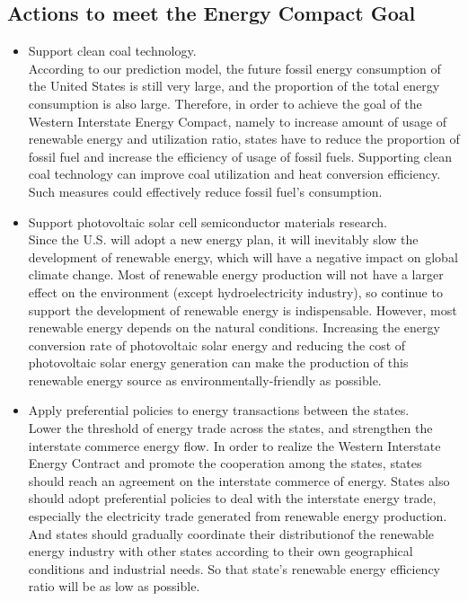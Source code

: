 \subsection{Actions to meet the Energy Compact Goal}
\begin{itemize}
	\item Support clean coal technology.\\ According to our prediction model, the future fossil energy consumption of the United States is still very large, and the proportion of the total energy consumption is also large.  Therefore, in order to achieve the goal of the Western Interstate Energy Compact, namely to increase amount of usage of renewable energy and utilization ratio, states have to reduce the proportion of fossil fuel and increase the efficiency of usage of fossil fuels. Supporting clean coal technology can improve coal utilization and heat conversion efficiency. Such measures could effectively reduce fossil fuel's consumption.
	\item Support photovoltaic solar cell semiconductor materials research.\\ Since the U.S. will adopt a new energy plan, it will inevitably slow the development of renewable energy, which will have a negative impact on global climate change. Most of renewable energy production will not have a larger effect on the environment (except hydroelectricity industry), so continue to support the development of renewable energy is indispensable. However, most renewable energy depends on the natural conditions. Increasing the energy conversion rate of photovoltaic solar energy and reducing the cost of photovoltaic solar energy generation can make the production of this renewable energy source as environmentally-friendly as possible.
	\item Apply preferential policies to energy transactions between the states.\\ Lower the threshold of energy trade across the states, and strengthen the interstate commerce energy flow. In order to realize the Western Interstate Energy Contract and promote the cooperation among the states, states should reach an agreement on the interstate commerce of energy. States also should adopt preferential policies to deal with the interstate energy trade, especially the electricity trade generated from renewable energy production. And states should gradually coordinate their distributionof the renewable energy industry with other states according to their own geographical conditions and industrial needs. So that state's renewable energy efficiency ratio will be as low as possible.
\end{itemize}

